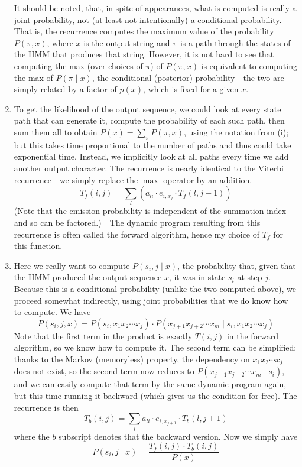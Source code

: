 \documentclass[11pt]{article}
\begin{document}
\begin{enumerate}
  It should be noted, that, in spite of appearances, what is computed is
  really a joint probability, not (at least not intentionally) a conditional
  probability.  That is, the recurrence computes the maximum value of
  the probability $P(\pi,x)$, where $x$ is the output string and $\pi$ is
  a path through the states of the HMM that produces that string.
  However, it is not hard to see that computing the max (over choices of
  $\pi$) of $P(\pi,x)$ is equivalent to computing the max of $P(\pi\mid x)$,
  the conditional (posterior) probability---the two are simply related
  by a factor of $p(x)$, which is fixed for a given $x$.
  \item
  To get the likelihood of the output sequence, we could look at every
  state path that can generate it, compute the probability of each such
  path, then sum them all to obtain $P(x) = \sum_{\pi} P(\pi,x)$, using
  the notation from (i); but this takes time proportional to the number
  of paths and thus could take exponential time.  Instead, we implicitly
  look at all paths every time we add another output character.  The recurrence
  is nearly identical to the Viterbi recurrence---we simply replace the
  $\max$ operator by an addition.
    $$T_f(i,j) = \sum_{l} \left(a_{li}\cdot e_{i,x_j}\cdot T_f(l,j-1)\right)$$
  (Note that the emission probability is independent of the summation index
  and so can be factored.)\ \ 
  The dynamic program resulting from this recurrence is often called the
  forward algorithm, hence my choice of $T_f$ for this function.
  \item
  Here we really want to compute $P(s_i,j\mid x)$, the probability that,
  given that the HMM produced the output sequence $x$, it was in state $s_i$
  at step $j$.  Because this is a conditional probability (unlike the
  two computed above), we proceed somewhat indirectly, using joint
  probabilities that we do know how to compute.  We have
   $$P(s_i,j,x) = P(s_i,x_1x_2\cdots x_j)\cdot P(x_{j+1}x_{j+2}\cdots x_m\mid s_i,x_1x_2\cdots x_j)$$
  Note that the first term in the product is exactly $T(i,j)$ in the forward
  algorithm, so we know how to compute it.  The second term can be simplified:
  thanks to the Markov (memoryless) property, the dependency on
  $x_1x_2\cdots x_j$ does not exist, so the second term now reduces to
  $P(x_{j+1}x_{j+2}\cdots x_m\mid s_i)$, and we can easily compute
  that term by the same dynamic program again, but this time running it
  backward (which gives us the condition for free).  The recurrence is then
   $$T_b(i,j) = \sum_{l} a_{li}\cdot e_{i,x_{j+1}}\cdot T_b(l,j+1)$$
  where the $b$ subscript denotes that the backward version.
  Now we simply have
   $$P(s_i,j\mid x) = \frac{T_f(i,j)\cdot T_b(i,j)}{P(x)}$$
\end{enumerate}
\end{document}

